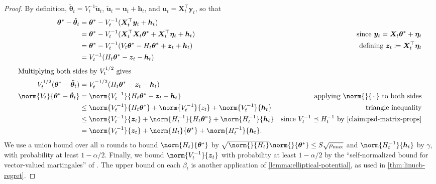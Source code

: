 \documentclass{article}
\renewcommand{\vec}[1]{\bm{#1}}
\newcommand{\wildcard}{\mathinner{\,{\cdot}\,}}
\newcommand{\defeq}{\coloneq}
\newcommand{\inv}[1]{#1^{-1}}
\providecommand\transp{\top}
\let\transpsymbol\transp
\renewcommand{\transp}[1]{#1^\transpsymbol}
\begin{document}
\begin{proof}
  By definition, $\tilde{\vec\theta}_t = \inv{V_t} \tilde{\vec u}_t$,
  $\tilde{\vec u}_t = \vec u_t + \vec h_t$, and $\vec u_t = \transp{\vec
    X_t} \vec y_t$, so that
  \begin{align*}
    \vec\theta^* - \tilde{\vec\theta}_t
    &= \vec\theta^* - \inv{V_t}(\transp{\vec X_t} \vec y_t + \vec h_t) \\
    &= \vec\theta^* - \inv{V_t}(\transp{\vec X_t} \vec X_t \vec\theta^*
      + \transp{\vec X_t} \vec\eta_t + \vec h_t)
    &\text{since } \vec y_t = \vec X_t \vec\theta^* + \vec\eta_t \\
    &= \vec\theta^* - \inv{V_t}(V_t \vec\theta^* - H_t \vec\theta^* + \vec z_t + \vec h_t)
    &\text{defining } \vec z_t \defeq \transp{\vec X_t} \vec\eta_t \\
    &= \inv{V_t}(H_t\vec\theta^* - \vec z_t - \vec h_t) \\
    \shortintertext{Multiplying both sides by $V_t^{1/2}$ gives}
    V_t^{1/2}(\vec\theta^* - \tilde{\vec\theta}_t)
    &= V_t^{-1/2}(H_t\vec\theta^* - \vec z_t - \vec h_t) \\
    \norm{V_t}{\vec\theta^* - \tilde{\vec\theta}_t}
    &= \norm{\inv{V_t}}{H_t\vec\theta^* - \vec z_t - \vec h_t}
    &\text{applying $\norm{}{\wildcard}$ to both sides}\\
    &\le \norm{\inv{V_t}}{H_t\vec\theta^*} + \norm{\inv{V_t}}{z_t}
      + \norm{\inv{V_t}}{\vec h_t} &\text{triangle inequality} \\
    &\le \norm{\inv{V_t}}{\vec z_t} + \norm{\inv{H_t}}{H_t\vec\theta^*}
      + \norm{\inv{H_t}}{\vec h_t}
    &\text{since $\inv{V_t} \preceq \inv{H_t}$ by \cref{claim:psd-matrix-props}} \\
    &= \norm{\inv{V_t}}{\vec z_t} + \norm{H_t}{\vec\theta^*} +
      \norm{\inv{H_t}}{\vec h_t}.
    &\qedhere
  \end{align*}
  We use a union bound over all $n$ rounds to bound
  $\norm{H_t}{\vec\theta^*}$ by
  $\sqrt{\norm{}{H_t}}\norm{}{\vec\theta^*} \le S\sqrt{\rho_{\max}}$
  and $\norm{\inv{H_t}}{\vec h_t}$ by $\gamma$, with probability at
  least $1-\alpha/2$.  Finally, we bound $\norm{\inv{V_t}}{\vec z_t}$
  with probability at least $1-\alpha/2$ by the ``self-normalized
  bound for vector-valued martingales'' of
  \citet[Theorem~1]{AbbasiYadkoriImprovedAlgorithmsLinear2011}.  The
  upper bound on each $\beta_t$ is another application of
  \cref{lemma:elliptical-potential}, as used in
  \cref{thm:linucb-regret}.
\end{proof}
\end{document}
